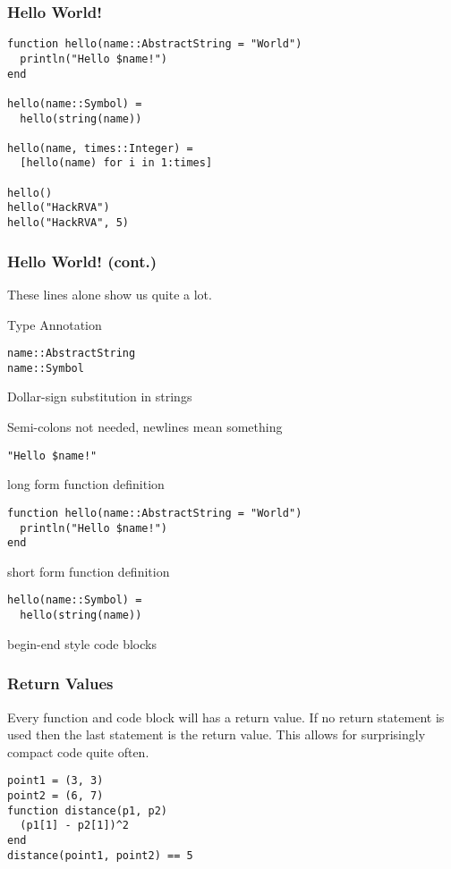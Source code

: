 \documentclass{beamer}
\begin{document}
\begin{frame}[fragile]
\frametitle{Hello World!}
\begin{verbatim}
function hello(name::AbstractString = "World")
  println("Hello $name!")
end

hello(name::Symbol) =
  hello(string(name))

hello(name, times::Integer) =
  [hello(name) for i in 1:times]

hello()
hello("HackRVA")
hello("HackRVA", 5)
\end{verbatim}
\end{frame}

\begin{frame}[fragile]
\frametitle{Hello World! (cont.)}
These lines alone show us quite a lot.

Type Annotation
\begin{verbatim}
name::AbstractString
name::Symbol
\end{verbatim}

Dollar-sign substitution in strings

Semi-colons not needed, newlines mean something
\begin{verbatim}
"Hello $name!"
\end{verbatim}

long form function definition
\begin{verbatim}
function hello(name::AbstractString = "World")
  println("Hello $name!")
end
\end{verbatim}

short form function definition
\begin{verbatim}
hello(name::Symbol) =
  hello(string(name))
\end{verbatim}

begin-end style code blocks
\end{frame}

\begin{frame}[fragile]
\frametitle{Return Values}
Every function and code block will has a return value. If no return statement
is used then the last statement is the return value. This allows for 
surprisingly compact code quite often.

\begin{verbatim}
point1 = (3, 3)
point2 = (6, 7)
function distance(p1, p2)
  (p1[1] - p2[1])^2
end
distance(point1, point2) == 5
\end{verbatim}

\end{frame}
\end{document}
